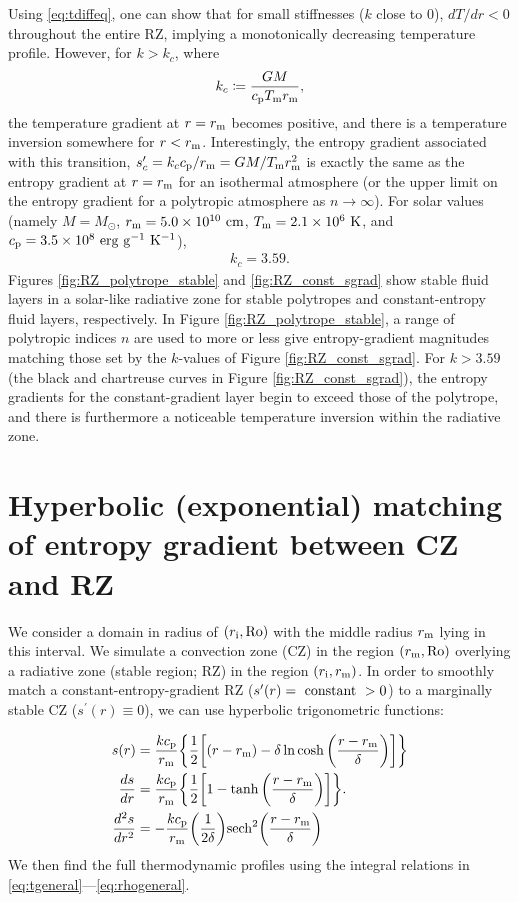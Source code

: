 \documentclass[12pt]{article} %
\newcommand{\rrm}{r_{\rm{m}}}
\newcommand{\ri}{r_{\rm{i}}}
\begin{document}
Using \eqref{eq:tdiffeq}, one can show that for small stiffnesses ($k$ close to $0$), $dT/dr < 0$ throughout the entire RZ, implying a monotonically decreasing temperature profile. However, for $k>k_c$, where
\begin{align}
k_c\coloneqq \frac{GM}{\cp T_{\rm{m}}\rrm},
\end{align}
the temperature gradient at $r=\rrm$ becomes positive, and there is a temperature inversion somewhere for $r<\rrm$. Interestingly, the entropy gradient associated with this transition, $s^\prime_c=k_c\cp/\rrm=GM/T_{\rm{m}}\rrm^2$ is exactly the same as the entropy gradient at $r=\rrm$ for an isothermal atmosphere (or the upper limit on the entropy gradient for a polytropic atmosphere as $n\rightarrow\infty$). For solar values (namely $M=M_\odot$, $\rrm = 5.0\times10^{10}\ \rm{cm}$, $T_{\rm{m}} = 2.1\times10^6\ \rm{K}$, and $\cp=3.5\times10^8\ \rm{erg\ g^{-1}\ K^{-1}}$),
\begin{align}
k_c = 3.59.
\label{eq:kc_solar}
\end{align}
Figures \ref{fig:RZ_polytrope_stable} and \ref{fig:RZ_const_sgrad} show stable fluid layers in a solar-like radiative zone for stable polytropes and constant-entropy fluid layers, respectively. In Figure \ref{fig:RZ_polytrope_stable}, a range of polytropic indices $n$ are used to more or less give entropy-gradient magnitudes matching those set by the $k$-values of Figure \ref{fig:RZ_const_sgrad}. For $k>3.59$ (the black and chartreuse curves in Figure \ref{fig:RZ_const_sgrad}), the entropy gradients for the constant-gradient layer begin to exceed those of the polytrope, and there is furthermore a noticeable temperature inversion within the radiative zone.

\section{Hyperbolic (exponential)  matching of entropy gradient between CZ and RZ}
We consider a domain in radius of $(\ri,\ro)$ with the middle radius $\rrm$ lying in this interval. We simulate a convection zone (CZ) in the region $(\rrm, \ro)$ overlying a radiative zone (stable region; RZ) in the region $(\ri,\rrm)$. In order to smoothly match a constant-entropy-gradient RZ ($s^\prime(r)=\ \rm{constant}\ > 0$) to a marginally stable CZ ($s^\prime(r)\equiv 0$), we can use hyperbolic trigonometric functions:

\begin{align}
s(r) &= \frac{k\cp}{\rrm}\bigg{\{}\frac{1}{2}{\bigg{[}(r-\rrm) -\delta\ln\cosh{\bigg{(}\frac{r-\rrm}{\delta}\bigg{)}\bigg{]}}\bigg{\}}}\label{eq:s_tanh_transition}\\
\frac{ds}{dr} &= \frac{k\cp}{\rrm}\bigg{\{}\frac{1}{2}\bigg{[}1 - \tanh{\bigg{(}\frac{r-\rrm}{\delta}\bigg{)}}\bigg{]}\bigg{\}}.\label{eq:dsdr_tanh_transition}\\
\frac{d^2s}{dr^2} &= -\frac{k\cp}{\rrm}\bigg{(}\frac{1}{2\delta}\bigg{)}{\rm{sech}}^2\bigg{(}\frac{r-\rrm}{\delta}\bigg{)}
\end{align}
We then find the full thermodynamic profiles using the integral relations in \eqref{eq:tgeneral}---\eqref{eq:rhogeneral}.
\end{document}
